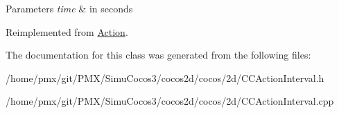 \begin{DoxyParams}{Parameters}
{\em time} & in seconds \\
\hline
\end{DoxyParams}


Reimplemented from \hyperlink{classAction_a937e646e63915e33ad05ba149bfcf239}{Action}.



The documentation for this class was generated from the following files\+:\begin{DoxyCompactItemize}
\item 
/home/pmx/git/\+P\+M\+X/\+Simu\+Cocos3/cocos2d/cocos/2d/C\+C\+Action\+Interval.\+h\item 
/home/pmx/git/\+P\+M\+X/\+Simu\+Cocos3/cocos2d/cocos/2d/C\+C\+Action\+Interval.\+cpp\end{DoxyCompactItemize}
